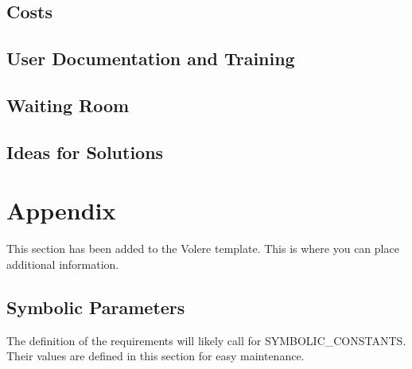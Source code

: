 \documentclass[12pt, titlepage]{article}
\begin{document}
	\subsection{Costs}

	

	\subsection{User Documentation and Training}

	\subsection{Waiting Room}

	\subsection{Ideas for Solutions}

\newpage





\newpage

\section{Appendix}

This section has been added to the Volere template.  This is where you can place
additional information.

	\subsection{Symbolic Parameters}

	The definition of the requirements will likely call for SYMBOLIC\_CONSTANTS.
	Their values are defined in this section for easy maintenance.
\end{document}
